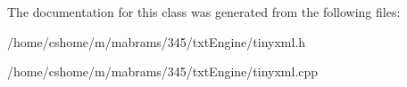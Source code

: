 The documentation for this class was generated from the following files:\begin{DoxyCompactItemize}
\item 
/home/cshome/m/mabrams/345/txtEngine/tinyxml.h\item 
/home/cshome/m/mabrams/345/txtEngine/tinyxml.cpp\end{DoxyCompactItemize}
